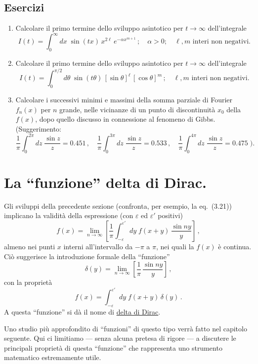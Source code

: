 \documentclass[11pt, a4paper]{book}
\numberwithin{equation}{section}
\newenvironment{esercizi}{\subsection*{Esercizi}\begin{enumerate}}{\end{enumerate}}
\begin{document}
\begin{esercizi}
\item Calcolare il primo termine dello sviluppo asintotico per $t\to\infty$ dell'integrale
\[
  I(t) = \int_0^\infty dx\;\sin(tx)\,x^{2\ell}\,e^{-\alpha x^{m+1}}\,;\quad
  \alpha>0;\quad \ell,m \text{ interi non negativi.}
\]

\item Calcolare il primo termine dello sviluppo asintotico per $t\to\infty$ dell'integrale
\[
  I(t) = \int_0^{\pi/2} d\theta\;\sin(t\theta)\,[\sin\theta]^\ell\,[\cos\theta]^m\,;\quad
  \ell,m \text{ interi non negativi.}
\]

\item Calcolare i successivi minimi e massimi della somma parziale di Fourier $f_n(x)$ per $n$ grande, nelle vicinanze di un punto di discontinuità $x_0$ della $f(x)$, dopo quello discusso in connessione al fenomeno di Gibbs. (Suggerimento:
\[
  \frac{1}{\pi}\int_0^{2\pi} dz\;\frac{\sin z}{z} = 0.451\,,\quad
  \frac{1}{\pi}\int_0^{3\pi} dz\;\frac{\sin z}{z} = 0.533\,,\quad
  \frac{1}{\pi}\int_0^{4\pi} dz\;\frac{\sin z}{z} = 0.475\;\biggr).
\]
\end{esercizi}

\section{La ``funzione'' delta di Dirac.}

Gli sviluppi della precedente sezione (confronta, per esempio, la eq.\ (3.21)) implicano la validità della espressione (con $\varepsilon$ ed $\varepsilon'$ positivi)
\begin{equation}
  f(x) = \lim_{n\to\infty}\left[\frac{1}{\pi}\int_{-\varepsilon}^{\varepsilon'} dy\;
  f(x+y)\,\frac{\sin ny}{y}\right]\,, \tag{1}
\end{equation}
almeno nei punti $x$ interni all'intervallo da $-\pi$ a $\pi$, nei quali la $f(x)$ è continua. Ciò suggerisce la introduzione formale della ``funzione''
\begin{equation}
  \delta(y) = \lim_{n\to\infty}\left[\frac{1}{\pi}\,\frac{\sin ny}{y}\right]\,, \tag{2}
\end{equation}
con la proprietà
\begin{equation}
  f(x) = \int_{-\varepsilon}^{\varepsilon'} dy\;f(x+y)\,\delta(y)\,. \tag{3}
\end{equation}
A questa ``funzione'' si dà il nome di \uline{delta di Dirac}.

Uno studio più approfondito di ``funzioni'' di questo tipo verrà fatto nel capitolo seguente. Qui ci limitiamo --- senza alcuna pretesa di rigore --- a discutere le principali proprietà di questa ``funzione'' che rappresenta uno strumento matematico estremamente utile.
\end{document}
